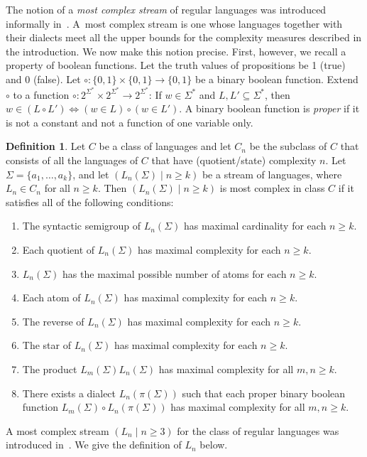 \documentclass[final]{dmtcs-episciences}
\renewcommand{\ge}{\geqslant}
\newcommand{\Sig}{\Sigma}
\newcommand{\be}{\begin{enumerate}}
\newcommand{\ee}{\end{enumerate}}
\theoremstyle{definition}
\newtheorem{definition}{Definition}
\theoremstyle{remark}
\begin{document}
The notion of a \emph{most complex stream} of regular languages was introduced informally in~\cite{Brz13}. 
A~most complex stream is one whose languages together with  their dialects  meet all the upper bounds for the complexity measures described in the introduction.
We now make this notion precise. First, however, we recall a property of boolean functions.
Let the truth values of propositions be 1 (true) and 0 (false). Let $\circ\colon \{0,1\}\times \{0,1\} \to \{0,1\}$ be a binary boolean function.
Extend $\circ$ to a function
$\circ\colon 2^{\Sig^*}\times 2^{\Sig^*}\to 2^{\Sig^*}$:
If $w\in \Sig^*$ and $L,L'\subseteq \Sig^*$, 
then $w\in (L\circ L') \Leftrightarrow (w\in L) \circ (w\in L').$
A binary boolean function is \emph{proper} if it is not a constant  and not a function of one variable only. 


\begin{definition}
Let $C$ be a class of languages and let $C_n$ be the subclass of $C$ that consists of all the languages of $C$ that have (quotient/state) complexity $n$.
Let $\Sig=\{a_1,\dots,a_k\}$, and let $(L_n(\Sig) \mid n\ge k)$ be a stream of languages, where $L_n\in C_n$ for all $n\ge k$. Then $(L_n(\Sig) \mid n\ge k)$ is most complex in class $C$ if it satisfies all of the following conditions:
\be
\item
The syntactic semigroup of $L_n(\Sig)$ has maximal cardinality for each $n\ge k$.
\item
Each quotient of $L_n(\Sig)$ has maximal   complexity for each $n\ge k$.
\item
$L_n(\Sig)$ has the maximal possible number of atoms for each $n\ge k$.
\item
Each atom of $L_n(\Sig)$ has maximal complexity for each $n\ge k$.
\item
The reverse of $L_n(\Sig)$ has maximal complexity for each $n\ge k$.
\item 
The star of $L_n(\Sig)$ has maximal  complexity for each $n\ge k$.
\item
The product
$L_m(\Sig)L_n(\Sig)$ has maximal  complexity for all $m,n\ge k$.
\item
There exists a dialect $L_n(\pi(\Sig))$ such that each proper binary boolean function 
$L_m(\Sig)\circ L_n(\pi(\Sig))$ has maximal  complexity for all $m,n\ge k$.
\ee
\end{definition}

A most complex stream $(L_n \mid n \ge 3)$ for the class of regular languages was introduced in~\cite{Brz13}. 
We give the definition of $L_n$ below.
\end{document}
